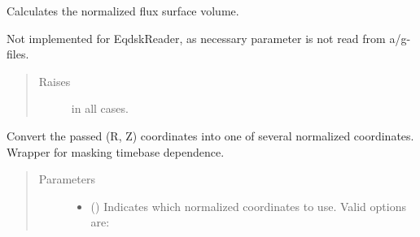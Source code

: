 \documentclass[letterpaper,10pt,english]{sphinxmanual}
\begin{document}
\begin{fulllineitems}
\begin{fulllineitems}
\begin{sphinxVerbatim}[commandchars=\\\{\}]
    
\end{sphinxVerbatim}

\end{fulllineitems}


\begin{fulllineitems}
\label{\detokenize{eqtools:eqtools.eqdskreader.EqdskReader.rz2volnorm}}
Calculates the normalized flux surface volume.

Not implemented for EqdskReader, as necessary parameter
is not read from a/g-files.
\begin{quote}\begin{description}
\item[{Raises}] \leavevmode
{} \textendash{} in all cases.

\end{description}\end{quote}

\end{fulllineitems}


\begin{fulllineitems}
\label{\detokenize{eqtools:eqtools.eqdskreader.EqdskReader.rz2rho}}
Convert the passed (R, Z) coordinates into one of several
normalized coordinates.  Wrapper for
{\hyperref[\detokenize{eqtools:eqtools.core.Equilibrium.rz2rho}]{}} masking
timebase dependence.
\begin{quote}\begin{description}
\item[{Parameters}] \leavevmode\begin{itemize}
\item {} 
 () \textendash{} 
Indicates which normalized coordinates to use.
Valid options are:
\begin{quote}



\end{quote}
\end{itemize}
\end{description}
\end{quote}
\end{fulllineitems}
\end{fulllineitems}
\end{document}
